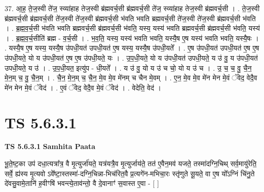 \documentclass[17pt]{extarticle}
\begin{document}
37. आ॒ह॒ ते॒ज॒स्वी ते॑ज॒ स्व्या॑हाह तेज॒स्वी ब्र॑ह्मवर्च॒सी ब्र॑ह्मवर्च॒सी ते॑ज॒ स्व्या॑हाह तेज॒स्वी ब्र॑ह्मवर्च॒सी । . ते॒ज॒स्वी ब्र॑ह्मवर्च॒सी ब्र॑ह्मवर्च॒सी ते॑ज॒स्वी ते॑ज॒स्वी ब्र॑ह्मवर्च॒सी भ॑वति भवति ब्रह्मवर्च॒सी ते॑ज॒स्वी ते॑ज॒स्वी ब्र॑ह्मवर्च॒सी भ॑वति । . ब्र॒ह्म॒व॒र्च॒सी भ॑वति भवति ब्रह्मवर्च॒सी ब्र॑ह्मवर्च॒सी भ॑वति॒ यस्य॒ यस्य॑ भवति ब्रह्मवर्च॒सी ब्र॑ह्मवर्च॒सी भ॑वति॒ यस्य॑ । . ब्र॒ह्म॒व॒र्च॒सीति॑ ब्रह्म - व॒र्च॒सी । . भ॒व॒ति॒ यस्य॒ यस्य॑ भवति भवति॒ यस्यै॒ष ए॒ष यस्य॑ भवति भवति॒ यस्यै॒षः । . यस्यै॒ष ए॒ष यस्य॒ यस्यै॒ष उ॑पधी॒यत॑ उपधी॒यत॑ ए॒ष यस्य॒ यस्यै॒ष उ॑पधी॒यते᳚ । . ए॒ष उ॑पधी॒यत॑ उपधी॒यत॑ ए॒ष ए॒ष उ॑पधी॒यते॒ यो य उ॑पधी॒यत॑ ए॒ष ए॒ष उ॑पधी॒यते॒ यः । . उ॒प॒धी॒यते॒ यो य उ॑पधी॒यत॑ उपधी॒यते॒ य उ॑ वु॒ य उ॑पधी॒यत॑ उपधी॒यते॒ य उ॑ । . उ॒प॒धी॒यत॒ इत्यु॑प - धी॒यते᳚ । . य उ॑ वु॒ यो य उ॑ च चो॒ यो य उ॑ च । . उ॒ च॒ च॒ वु॒ चै॒न॒ मे॒न॒म् च॒ वु॒ चै॒न॒म् । . चै॒न॒ मे॒न॒म् च॒ चै॒न॒ मे॒व मे॒व मे॑नम् च चैन मे॒वम् । . ए॒न॒ मे॒व मे॒व मे॑न मेन मे॒वं ॅवेद॒ वेदै॒व मे॑न मेन मे॒वं ॅवेद॑ । . ए॒वं ॅवेद॒ वेदै॒व मे॒वं ॅवेद॑ । . वेदेति॒ वेद॑ । \newline
\pagebreak
{}

\section{ TS 5.6.3.1 }

\textbf{TS 5.6.3.1 } \newline
\textbf{Samhita Paata} \newline

भू॒ते॒ष्ट॒का उप॑ दधा॒त्यत्रा᳚त्र॒ वै मृ॒त्युर्जा॑यते॒ यत्र॑यत्रै॒व मृ॒त्युर्जाय॑ते॒ तत॑ ए॒वैन॒मव॑ यजते॒ तस्मा॑दग्नि॒चिथ् सर्व॒मायु॑रेति॒ सर्वे॒ ह्य॑स्य मृ॒त्यवो ऽवे᳚ष्टा॒स्तस्मा॑-दग्नि॒चिन्ना-भिच॑रित॒वै प्र॒त्यगे॑न-मभिचा॒रः स्तृ॑णुते सू॒यते॒ वा ए॒ष यो᳚ऽग्निं चि॑नु॒ते दे॑वसु॒वामे॒तानि॑ ह॒वीꣳषि॑ भवन्त्ये॒ताव॑न्तो॒ वै दे॒वानाꣳ॑ स॒वास्त ए॒वा - [  ] \newline
\end{document}
